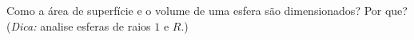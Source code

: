 Como a área de superfície e o volume de uma esfera são dimensionados? Por que? (\textit{Dica:} analise esferas de raios $1$ e $R$.)

